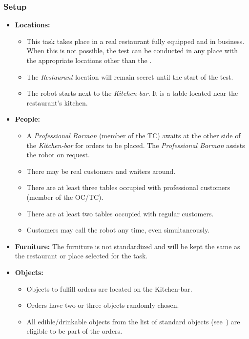 \subsubsection*{Setup}
\begin{itemize}[nosep]	
	\item \textbf{Locations:} 
	\begin{itemize}
		\item This task takes place in a real restaurant fully equipped and in business. When this is not possible, the test can be conducted in any place with the appropriate locations other than the \Arena{}.
		\item The \emph{Restaurant} location will remain secret until the start of the test.
		\item The robot starts next to the \emph{Kitchen-bar}. It is a table located near the restaurant's kitchen.
	\end{itemize}	 
	\item \textbf{People:} 
	\begin{itemize}
		\item  A \emph{Professional Barman} (member of the TC) awaits at the other side of the \emph{Kitchen-bar} for orders to be placed. The \emph{Professional Barman} assists the robot on request.
		\item There may be real customers and waiters around.
		\item There are at least three tables occupied with professional customers (member of the OC/TC). 
		\item There are at least two tables occupied with regular customers.
		\item Customers may call the robot any time, even simultaneously.
	\end{itemize}
	\item \textbf{Furniture:} The furniture is not standardized and will be kept the same as the restaurant or place selected for the task.
	\item \textbf{Objects:} 
	\begin{itemize}
	\item Objects to fulfill orders are located on the Kitchen-bar.
	\item Orders have two or three objects randomly chosen.
	\item All edible/drinkable objects from the list of standard objects (see~) are eligible to be part of the orders.
	\end{itemize}
\end{itemize}

